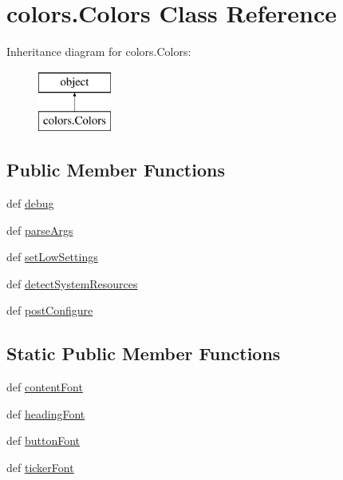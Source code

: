 \hypertarget{classcolors_1_1Colors}{}\section{colors.\+Colors Class Reference}
\label{classcolors_1_1Colors}
Inheritance diagram for colors.\+Colors\+:\begin{figure}[H]
\begin{center}
\leavevmode
\includegraphics[height=2.000000cm]{classcolors_1_1Colors}
\end{center}
\end{figure}
\subsection*{Public Member Functions}
\begin{DoxyCompactItemize}
\item 
def \hyperlink{classcolors_1_1Colors_a5198eac2a4099c9c049a6bdb579fe38b}{debug}
\item 
def \hyperlink{classcolors_1_1Colors_a33e4ec39a85e129cc36f7df7f7bf50a9}{parse\+Args}
\item 
def \hyperlink{classcolors_1_1Colors_ae410ff6c2a2b811e025133b9ad864b97}{set\+Low\+Settings}
\item 
def \hyperlink{classcolors_1_1Colors_a05223902d36ff1154ebbfd776ce1622c}{detect\+System\+Resources}
\item 
def \hyperlink{classcolors_1_1Colors_a1a21c465b7c0eab2d149e7d0ac6e3c32}{post\+Configure}
\end{DoxyCompactItemize}
\subsection*{Static Public Member Functions}
\begin{DoxyCompactItemize}
\item 
def \hyperlink{classcolors_1_1Colors_a9fbc9fda9cbd24a5237e9dda8b0a8058}{content\+Font}
\item 
def \hyperlink{classcolors_1_1Colors_a3aec41c6709e4d98060a9f21e2623850}{heading\+Font}
\item 
def \hyperlink{classcolors_1_1Colors_a03221c598ccc7de3891b2088e8b3e78f}{button\+Font}
\item 
def \hyperlink{classcolors_1_1Colors_a960501bc981123ca2fcca0a6da244f00}{ticker\+Font}
\end{DoxyCompactItemize}
